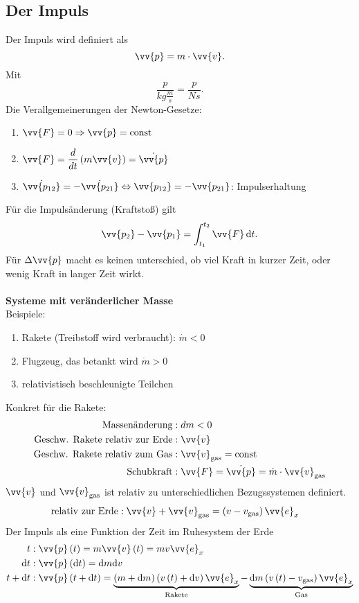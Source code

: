 \documentclass[a4paper,12pt]{article}
\newcommand{\td}{\,\text{d}}
\numberwithin{equation}{section}
\begin{document}
\subsection{Der Impuls}
Der Impuls wird definiert als
\[ 
        \vv{p}=m\cdot \vv{v}
.\] 
Mit
\[ 
        \dfrac{p}{kg\tfrac{m}{s}}=\dfrac{p}{Ns}
.\] 
Die Verallgemeinerungen der Newton-Gesetze:
\begin{enumerate}[label=\arabic*. NG,wide]
        \item $\vv{F}=0\Rightarrow \vv{p}=\text{const}$ 
        \item $\vv{F}=\dfrac{d}{dt}\left(m\vv{v}\right)=\dot{\vv{p}}$ 
        \item $\dot{\vv{p_{12} }}=-\dot{\vv{p_{21} }}\Leftrightarrow \vv{p_{12}}=-\vv{p_{21}}$: Impulserhaltung
\end{enumerate}
Für die Impulsänderung (\grqq Kraftstoß\grqq) gilt
\[ 
        \vv{p_2}-\vv{p_1}=\int_{t_1}^{t_2}\vv{F}\td t
.\] 
Für $\Delta \vv{p} $ macht es keinen unterschied, ob viel Kraft in kurzer Zeit, oder wenig Kraft in langer Zeit wirkt.
\\\hfill\\\textbf{Systeme mit veränderlicher Masse}\\ 
Beispiele:
\begin{enumerate}[label=]
        \item Rakete (Treibstoff wird verbraucht): $\dot{m}<0$ 
        \item Flugzeug, das betankt wird $\dot{m}>0$ 
        \item relativistisch beschleunigte Teilchen
\end{enumerate}
Konkret für die Rakete:
\begin{align*}
        \text{Massenänderung}&:dm<0\\
        \text{Geschw. Rakete relativ zur Erde}&:\vv{v}\\
        \text{Geschw. Rakete relativ zum Gas}&:\vv{v}_{\text{gas}}=\text{const}\\
        \text{Schubkraft}&:\vv{F}=\dot{\vv{p}}=\dot{m}\cdot \vv{v}_{\text{gas}}
\end{align*}
$\vv{v}$ und $\vv{v}_{\text{gas}}$ ist relativ zu unterschiedlichen Bezugssystemen definiert.
\begin{align*}
        \text{relativ zur Erde}&:\vv{v}+\vv{v}_{\text{gas}}=\left(v-v_{\text{gas}}\right)\vv{e}_x
\end{align*}
Der Impuls als eine Funktion der Zeit im Ruhesystem der Erde
\begin{align*}
        t&:\vv{p}\left(t\right)=m\vv{v}\left(t\right)=mv \vv{e}_x\\
        \text{d}t&:\vv{p}\left(\text{d}t\right)=\text{d}m\text{d}v\\
        t+\text{d}t&:\vv{p}\left(t+\text{d}t\right)=\underbrace{\left(m+\text{d}m\right)\left(v\left(t\right)+\text{d}v\right)\vv{e}_x}_{\text{Rakete}}-\underbrace{\text{d}m\left(v\left(t\right)-v_{\text{gas}}\right)\vv{e}_x}_{\text{Gas}}
\end{align*}
\end{document}
